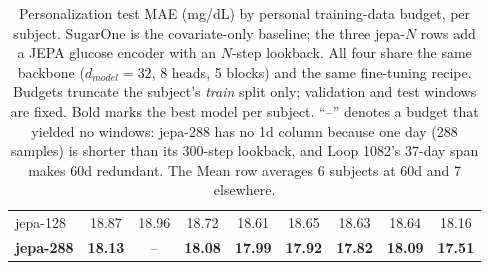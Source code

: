 \begin{table}[ht]
\begin{tabular}{lcccccccc}
        jepa-128 & 18.87 & 18.96 & 18.72 & 18.61 & 18.65 & 18.63 & 18.64 & 18.16 \\
        \textbf{jepa-288} & \textbf{18.13} & -- & \textbf{18.08} & \textbf{17.99} & \textbf{17.92} & \textbf{17.82} & \textbf{18.09} & \textbf{17.51} \\
        \hline
    \end{tabular}
    \caption{Personalization test MAE (mg/dL) by personal training-data budget, per subject. SugarOne is the covariate-only baseline; the three jepa-$N$ rows add a JEPA glucose encoder with an $N$-step lookback. All four share the same backbone ($d_{model}=32$, 8 heads, 5 blocks) and the same fine-tuning recipe. Budgets truncate the subject's \emph{train} split only; validation and test windows are fixed. Bold marks the best model per subject. ``--'' denotes a budget that yielded no windows: jepa-288 has no 1d column because one day (288 samples) is shorter than its 300-step lookback, and Loop 1082's 37-day span makes 60d redundant. The Mean row averages 6 subjects at 60d and 7 elsewhere.}
    \label{tab:jepa-personalization-mae}
\end{table}

